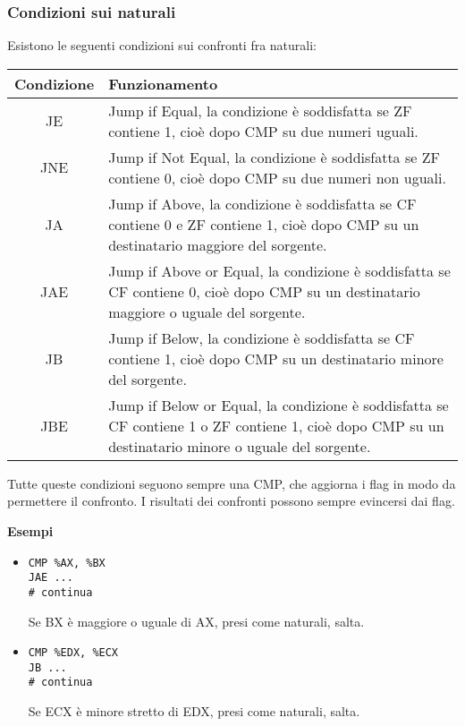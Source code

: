 \documentclass[a4paper,11pt]{article}
\begin{document}
\subsubsection{Condizioni sui naturali}
Esistono le seguenti condizioni sui confronti fra naturali:

\begin{table}[h!]
	\center {}
	\begin{tabular} { c  p{10cm} }
		\bfseries Condizione & \bfseries Funzionamento \\
		\hline 
		JE & Jump if Equal, la condizione è soddisfatta se ZF contiene 1, cioè dopo CMP su due numeri uguali. \\
		JNE & Jump if Not Equal, la condizione è soddisfatta se ZF contiene 0, cioè dopo CMP su due numeri non uguali. \\ 
		JA & Jump if Above, la condizione è soddisfatta se CF contiene 0 e ZF contiene 1, cioè dopo CMP su un destinatario maggiore del sorgente. \\
		JAE & Jump if Above or Equal, la condizione è soddisfatta se CF contiene 0, cioè dopo CMP su un destinatario maggiore o uguale del sorgente. \\ 
		JB & Jump if Below, la condizione è soddisfatta se CF contiene 1, cioè dopo CMP su un destinatario minore del sorgente. \\
		JBE & Jump if Below or Equal, la condizione è soddisfatta se CF contiene 1 o ZF contiene 1, cioè dopo CMP su un destinatario minore o uguale del sorgente. \\ 
	\end{tabular}
\end{table}

Tutte queste condizioni seguono sempre una CMP, che aggiorna i flag in modo da permettere il confronto.
I risultati dei confronti possono sempre evincersi dai flag.

\par\medskip
\noindent
\textbf{\textsf{Esempi}} \\
\begin{itemize}
	\item 
\begin{lstlisting}[language=assembler,style=codestyle]	
CMP %AX, %BX
JAE ...
# continua
\end{lstlisting}
Se BX è maggiore o uguale di AX, presi come naturali, salta.

	\item 
\begin{lstlisting}[language=assembler,style=codestyle]	
CMP %EDX, %ECX
JB ...
# continua
\end{lstlisting}
Se ECX è minore stretto di EDX, presi come naturali, salta.
\end{itemize}
\end{document}

